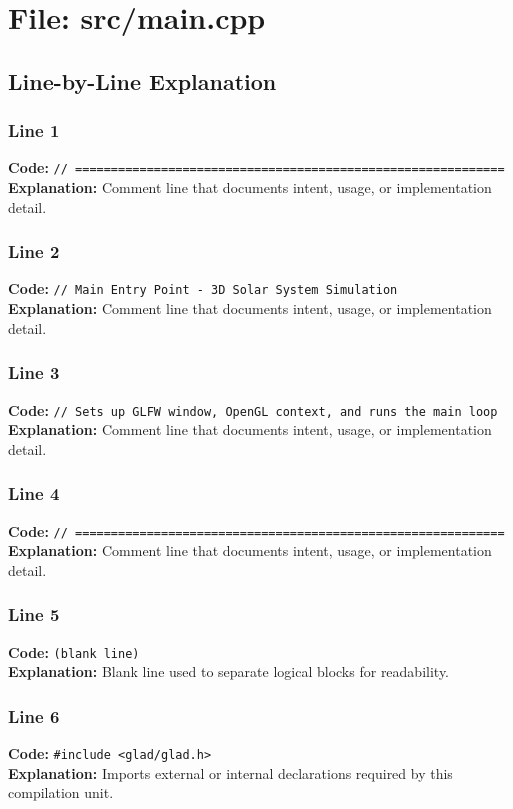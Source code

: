 \documentclass[11pt,a4paper]{article}
\begin{document}
\newpage
\section{File: src/main.cpp}
\subsection{Line-by-Line Explanation}
\subsubsection*{Line 1}
\textbf{Code:} \verb|// ============================================================|\\
\textbf{Explanation:} Comment line that documents intent, usage, or implementation detail.

\subsubsection*{Line 2}
\textbf{Code:} \verb|// Main Entry Point - 3D Solar System Simulation|\\
\textbf{Explanation:} Comment line that documents intent, usage, or implementation detail.

\subsubsection*{Line 3}
\textbf{Code:} \verb|// Sets up GLFW window, OpenGL context, and runs the main loop|\\
\textbf{Explanation:} Comment line that documents intent, usage, or implementation detail.

\subsubsection*{Line 4}
\textbf{Code:} \verb|// ============================================================|\\
\textbf{Explanation:} Comment line that documents intent, usage, or implementation detail.

\subsubsection*{Line 5}
\textbf{Code:} \texttt{(blank line)}\\
\textbf{Explanation:} Blank line used to separate logical blocks for readability.

\subsubsection*{Line 6}
\textbf{Code:} \verb|#include <glad/glad.h>|\\
\textbf{Explanation:} Imports external or internal declarations required by this compilation unit.
\end{document}
